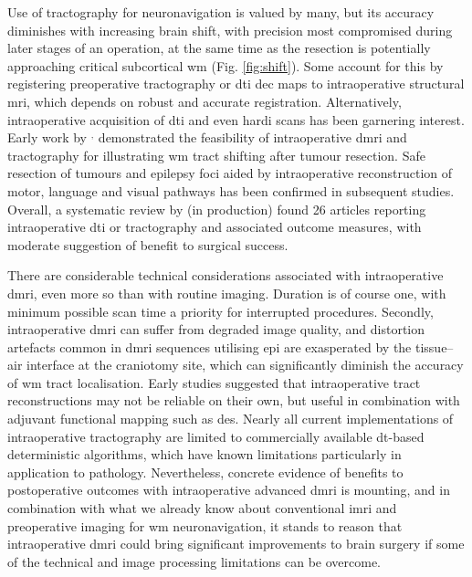 Use of tractography for neuronavigation is valued by many, but its accuracy diminishes with increasing brain shift, with precision most compromised during later stages of an operation, at the same time as the resection is potentially approaching critical subcortical \gls{wm}\autocite{Yang2019} (Fig. \ref{fig:shift}).
Some account for this by registering preoperative tractography or \gls{dti} \gls{dec} maps to intraoperative structural \gls{mri}\autocite{Nimsky2006a,Tamura2022}, which depends on robust and accurate registration\autocite{Beare2016}.
Alternatively, intraoperative acquisition of \gls{dti} and even \gls{hardi} scans has been garnering interest.
Early work by \textcite{Nimsky2005}$^,$\autocite{Nimsky2005a} demonstrated the feasibility of intraoperative \gls{dmri} and tractography for illustrating \gls{wm} tract shifting after tumour resection.
Safe resection of tumours and epilepsy foci aided by intraoperative reconstruction of motor\autocite{Maesawa2010,Javadi2017}, language\autocite{DAndrea2016,Li2021} and visual\autocite{Daga2012,Cui2015} pathways has been confirmed in subsequent studies.
Overall, a systematic review by \citeauthor{Aylmore} (in production)\autocite{Aylmore} found 26 articles reporting intraoperative \gls{dti} or tractography and associated outcome measures, with moderate suggestion of benefit to surgical success.

There are considerable technical considerations associated with intraoperative \gls{dmri}, even more so than with routine imaging.
Duration is of course one, with minimum possible scan time a priority for interrupted procedures.
Secondly, intraoperative \gls{dmri} can suffer from degraded image quality\autocite{Roder2019}, and distortion artefacts common in \gls{dmri} sequences utilising \gls{epi} are exasperated by the tissue--air interface at the craniotomy site\autocite{Elliott2020}, which can significantly diminish the accuracy of \gls{wm} tract localisation\autocite{Yang2022}.
Early studies suggested that intraoperative tract reconstructions may not be reliable on their own, but useful in combination with adjuvant functional mapping such as \gls{des}\autocite{Ostry2013}.
Nearly all current implementations of intraoperative tractography are limited to commercially available \gls{dt}-based deterministic algorithms, which have known limitations particularly in application to pathology.
Nevertheless, concrete evidence of benefits to postoperative outcomes with intraoperative advanced \gls{dmri} is mounting\autocite{DAndrea2012,Cui2015,Maesawa2010}, and in combination with what we already know about conventional \gls{imri} and preoperative imaging for \gls{wm} neuronavigation, it stands to reason that intraoperative \gls{dmri} could bring significant improvements to brain surgery if some of the technical and image processing limitations can be overcome.


